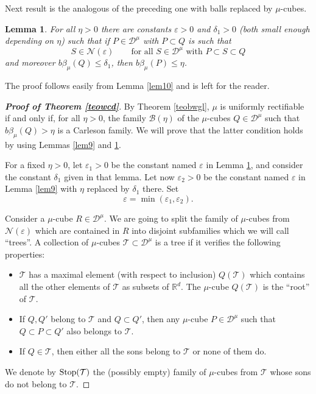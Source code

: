 \documentclass[11pt]{amsart}
\newcommand{\R}{{\mathbb R}}       %
\newcommand{\DD}{{\mathcal D}}
\newcommand{\BZ}{{\mathcal B}}
\newcommand{\NN}{{\mathcal N}}
\newcommand{\TT}{{\mathcal T}}
\newcommand{\ve}{{\varepsilon}}
\newcommand{\vv}{{\vspace{2mm}}}
\newcommand{\sss}{{\rm Stop}}
\newtheorem{lemma}[theorem]{Lemma}
\theoremstyle{definition}
\theoremstyle{remark}
\numberwithin{equation}{section}
\begin{document}
Next result is the analogous of the preceding one with balls replaced by $\mu$-cubes. 

\begin{lemma}\label{lem11}
For all $\eta>0$ there are constants $\ve>0$ and $\delta_1>0$ (both small enough depending on $\eta$) such that if $P
\in\DD^\mu$ with $P\subset Q$ is such that
$$S\in\NN(\ve)\qquad\mbox{for all $S\in\DD^\mu$ with $P\subset S\subset Q$}$$
and moreover $b\beta_\mu(Q)\leq\delta_1$,
then $b\beta_\mu(P)\leq \eta$.
\end{lemma}

The proof follows easily from Lemma \ref{lem10} and is left for the reader.
\vv


\begin{proof}[\bf Proof of Theorem \ref{teowcd}]
By Theorem \ref{teobwgl}, $\mu$ is uniformly rectifiable if and only if, for all $\eta>0$, the family 
$\BZ(\eta)$ of the $\mu$-cubes $Q\in\DD^\mu$ such that $b\beta_\mu(Q)>\eta$ is a Carleson family.
We will prove that the latter condition holds by using Lemmas \ref{lem9} and \ref{lem11}.

For a fixed $\eta>0$, let $\ve_1>0$ be the constant named $\ve$ in Lemma \ref{lem11}, and consider the constant $\delta_1$ given in that lemma. Let now $\ve_2>0$ be the constant named $\ve$ in Lemma
\ref{lem9} with $\eta$ replaced by $\delta_1$ there. Set
$$\ve=\min(\ve_1,\ve_2).$$

Consider a $\mu$-cube $R\in\DD^\mu$.
We are going to split the family of $\mu$-cubes from $\NN(\ve)$ which are contained in $R$ into disjoint
subfamilies which we will call ``trees''. A collection of $\mu$-cubes $\TT\subset\DD^\mu$ is a tree if it 
verifies the following properties:
\begin{itemize}
\item $\TT$ has a maximal element (with respect to inclusion) $Q(\TT)$ which contains all the other
elements of $\TT$ as subsets of $\R^d$. The $\mu$-cube $Q(\TT)$ is the ``root'' of $\TT$.

\item If $Q,Q'$ belong to $\TT$ and $Q\subset Q'$, then any $\mu$-cube $P\in\DD^\mu$ such that $Q\subset P\subset
Q'$ also belongs to $\TT$.

\item If $Q\in\TT$, then either all the sons belong to $\TT$ or none of them do.
\end{itemize}
We denote by $\sss(\TT)$ the (possibly empty) family of $\mu$-cubes from $\TT$ whose sons do not 
belong to $\TT$.


\end{proof}
\end{document}
